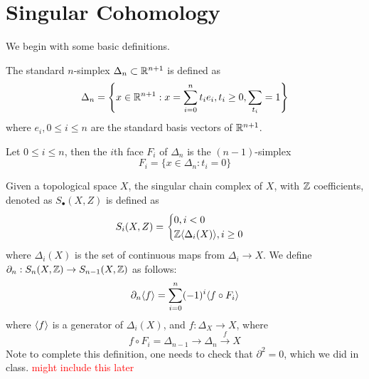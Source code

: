 \newpage
\chapter{Singular Cohomology}
We begin with some basic definitions.
\begin{defn}[$n$-simplex]
    The standard $n$-simplex $\Delta_n\subset\mathbb{R}^{n+1}$ is defined as 
    \begin{equation*}
        \Delta_n=\left\{x\in\mathbb{R}^{n+1}: x=\sum_{i=0}^nt_ie_i, t_i\geq 0, \sum_{t_i}=1\right\}
    \end{equation*}
    where $e_i, 0\leq i\leq n$ are the standard basis vectors of $\mathbb{R}^{n+1}$.
\end{defn}
\begin{defn}[face]
    Let $0\leq i\leq n$, then the $i$th face $F_i$ of $\Delta_n$ is the $(n-1)$-simplex 
    \begin{equation*}
        F_i=\{x\in\Delta_n:t_i=0\}
    \end{equation*}
\end{defn}
\begin{defn}
    Given a topological space $X$, the singular chain complex of $X$, with $\mathbb{Z}$ coefficients, denoted as $S_\bullet(X,Z)$ is defined as 
    \begin{equation*}
        S_i(X,Z)=\begin{cases}
            0, i<0\\
            \mathbb{Z}\langle\Delta_i(X)\rangle, i\geq 0
        \end{cases}
    \end{equation*}
    where $\Delta_i(X)$ is the set of continuous maps from $\Delta_i\to X$. We define $\partial_n:S_n(X,\mathbb{Z})\to S_{n-1}(X,\mathbb{Z})$ as follows:
    \begin{equation*}
        \partial_n\langle f\rangle=\sum_{i=0}^n(-1)^i\langle f\circ F_i\rangle
    \end{equation*}
    where $\langle f\rangle$ is a generator of $\Delta_i(X)$, and $f:\Delta_X\to X$, where 
    \begin{equation*}
        f\circ F_i=\Delta_{n-1}\to\Delta_n\xrightarrow{f}X
    \end{equation*}
    Note to complete this definition, one needs to check that $\partial^2=0$, which we did in class. \textcolor{red}{might include this later}
\end{defn}


